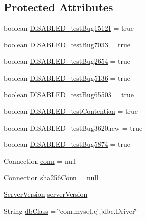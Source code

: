 \subsection*{Protected Attributes}
\begin{DoxyCompactItemize}
\item 
boolean \mbox{\hyperlink{classtestsuite_1_1_base_test_case_ab7e16b70df00394f5d55e8047c3c2471}{D\+I\+S\+A\+B\+L\+E\+D\+\_\+test\+Bug15121}} = true
\item 
boolean \mbox{\hyperlink{classtestsuite_1_1_base_test_case_aade0f7a71cb88d5c263fffd13a9581ac}{D\+I\+S\+A\+B\+L\+E\+D\+\_\+test\+Bug7033}} = true
\item 
boolean \mbox{\hyperlink{classtestsuite_1_1_base_test_case_aa0c548e48f82aa602ab584c833f083ca}{D\+I\+S\+A\+B\+L\+E\+D\+\_\+test\+Bug2654}} = true
\item 
boolean \mbox{\hyperlink{classtestsuite_1_1_base_test_case_ad648618fb57db1d2bfcf8c789334513f}{D\+I\+S\+A\+B\+L\+E\+D\+\_\+test\+Bug5136}} = true
\item 
boolean \mbox{\hyperlink{classtestsuite_1_1_base_test_case_ae901da5e006e157035ca0394e61d39b3}{D\+I\+S\+A\+B\+L\+E\+D\+\_\+test\+Bug65503}} = true
\item 
boolean \mbox{\hyperlink{classtestsuite_1_1_base_test_case_a366ca14a4b36186f1e93966bff8ae923}{D\+I\+S\+A\+B\+L\+E\+D\+\_\+test\+Contention}} = true
\item 
boolean \mbox{\hyperlink{classtestsuite_1_1_base_test_case_abe1fd049ff5baefd7e28b26736b26329}{D\+I\+S\+A\+B\+L\+E\+D\+\_\+test\+Bug3620new}} = true
\item 
boolean \mbox{\hyperlink{classtestsuite_1_1_base_test_case_a632731aff35d9e8b685332c73a4b70dd}{D\+I\+S\+A\+B\+L\+E\+D\+\_\+test\+Bug5874}} = true
\item 
Connection \mbox{\hyperlink{classtestsuite_1_1_base_test_case_a51c71d14ae22c75fb285989cc78b4730}{conn}} = null
\item 
Connection \mbox{\hyperlink{classtestsuite_1_1_base_test_case_a5bd183a70ffca96d160794ac4a6250a4}{sha256\+Conn}} = null
\item 
\mbox{\hyperlink{classcom_1_1mysql_1_1cj_1_1_server_version}{Server\+Version}} \mbox{\hyperlink{classtestsuite_1_1_base_test_case_a755284d3321cf420b44afe8b3d908bee}{server\+Version}}
\item 
String \mbox{\hyperlink{classtestsuite_1_1_base_test_case_ab78915f48e4a877fab1ace666b20f68a}{db\+Class}} = \char`\"{}com.\+mysql.\+cj.\+jdbc.\+Driver\char`\"{}
\item 

\end{DoxyCompactItemize}
